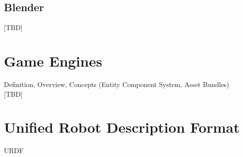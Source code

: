 
\subsection{Blender}
[TBD]

\section{Game Engines}
Definition, Overview, Concepts (Entity Component System, Asset Bundles) [TBD]

\section{Unified Robot Description Format}
\ac{URDF}